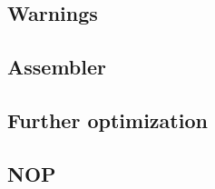 \subsection{Warnings}

\subsection{Assembler}

\subsection{Further optimization}

\subsection{NOP}

